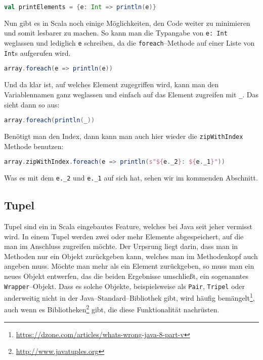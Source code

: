 \begin{lstlisting}[language=Scala,numbers=none]
val printElements = {e: Int => println(e)}
\end{lstlisting}

Nun gibt es in Scala noch einige Möglichkeiten, den Code weiter zu minimieren und somit lesbarer zu machen. So kann man die Typangabe von \texttt{e: Int} weglassen und lediglich \texttt{e} schreiben, da die \texttt{foreach}--Methode auf einer Liste von \texttt{Int}s aufgerufen wird.

\begin{lstlisting}[language=Scala,numbers=none]
array.foreach(e => println(e))
\end{lstlisting}

Und da klar ist, auf welches Element zugegriffen wird, kann man den Variablennamen ganz weglassen und einfach auf das Element zugreifen mit \texttt{\_}. Das sieht dann so aus:

\begin{lstlisting}[language=Scala,numbers=none]
array.foreach(println(_))
\end{lstlisting}

Benötigt man den Index, dann kann man auch hier wieder die \texttt{zipWithIndex} Methode benutzen:

\begin{lstlisting}[language=Scala,numbers=none]
array.zipWithIndex.foreach(e => println(s"${e._2}: ${e._1}"))
\end{lstlisting}

Was es mit dem \texttt{e.\_2} und \texttt{e.\_1} auf sich hat, sehen wir im kommenden Abschnitt.

\subsection{Tupel}
Tupel sind ein in Scala eingebautes Feature, welches bei Java seit jeher vermisst wird. In einem Tupel werden zwei oder mehr Elemente abgespeichert, auf die man im Anschluss zugreifen möchte. Der Urpsrung liegt darin, dass man in Methoden nur ein Objekt zurückgeben kann, welches man im Methodenkopf auch angeben muss. Möchte man mehr als ein Element zurückgeben, so muss man ein neues Objekt entwerfen, das die beiden Ergebnisse umschließt, ein sogenanntes \texttt{Wrapper}--Objekt. Dass es solche Objekte, beispielsweise als \texttt{Pair}, \texttt{Tripel} oder anderweitig nicht in der Java--Standard--Bibliothek gibt, wird häufig bemängelt\footnote{\url{https://dzone.com/articles/whats-wrong-java-8-part-v}}, auch wenn es Bibliotheken\footnote{\url{http://www.javatuples.org}} gibt, die diese Funktionalität nachrüsten.

